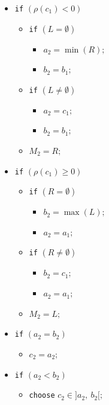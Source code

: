 \documentclass[
  11pt,
  a4paper,
]{article}
\begin{document}
\begin{itemize}
\begin{itemize}
		\item[$\bullet$] \texttt{if} $(\rho(c_1)<0)$
		\begin{itemize}
			\item[$\circ$]  \texttt{if} $(L=\emptyset)$
			\begin{itemize}
				\item[$\diamond$]  $a_2=\min(R);$
				\item[$\diamond$] $b_2=b_1;$
			\end{itemize}             
			\item[$\circ$] \texttt{if} $(L\neq\emptyset)$ 
			\begin{itemize} 
				\item[$\diamond$] $a_2=c_1;$
				\item[$\diamond$] $b_2=b_1;$
			\end{itemize}    
			\item[$\circ$] $M_2=R;$
		\end{itemize}     
		\item[$\bullet$] \texttt{if} $(\rho(c_1)\ge 0)$  
		\begin{itemize}			  
			\item[$\circ$] \texttt{if} $(R=\emptyset)$
			\begin{itemize}
				\item[$\diamond$] $b_2=\max(L);$
				\item[$\diamond$] $a_2=a_1;$
			\end{itemize}   
			\item[$\circ$] \texttt{if} $(R\neq\emptyset)$
			\begin{itemize}
				\item[$\diamond$] $b_2=c_1;$
				\item[$\diamond$] $a_2= a_1;$
			\end{itemize}    
			\item[$\circ$] $M_2=L;$
		\end{itemize} 
		\item[$\bullet$] \texttt{if} $(a_2=b_2)$
		\begin{itemize}
			\item[$\circ$] $c_2= a_2;$
		\end{itemize}   
		\item[$\bullet$] \texttt{if} $(a_2<b_2)$  
		\begin{itemize}
			\item[$\circ$] \texttt{choose} $c_2\in ]a_2,\ b_2[;$	
		\end{itemize}
	\end{itemize}
	

\end{itemize}
\end{document}
